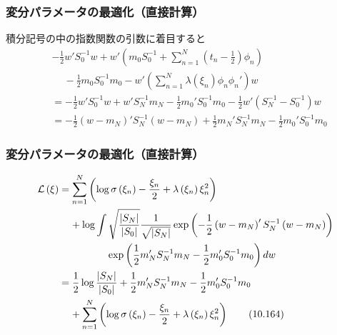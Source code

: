 \documentclass[10pt,hyperref={unicode}]{beamer}
\newcommand{\absolute}[1]{\left|#1\right|}
\newcommand{\parentheses}[1]{\left(#1\right)}
\newcommand{\energy}{\mathcal{L}}
\begin{document}
\begin{frame}
\frametitle{変分パラメータの最適化（直接計算）}
積分記号の中の指数関数の引数に着目すると
\begin{align*}
    &-\frac{1}{2}w'S_0^{-1}w
    + w'\parentheses{%
        m_0S_0^{-1} +
        \sum_{n = 1}^N \parentheses{t_n - \frac{1}{2}}\phi_n
    }\\
    &\phantom{-}- \frac{1}{2}m_0S_0^{-1}m_0
    - w'\parentheses{\sum_{n = 1}^N \lambda\parentheses{\xi_n}\phi_n\phi_n'}w
    \\
    &=-\frac{1}{2}w'S_0^{-1}w
    + w'S_N^{-1}m_N
    - \frac{1}{2}m_0'S_0^{-1}m_0
    - \frac{1}{2}w'\parentheses{S_N^{-1} - S_0^{-1}}w \\
    &= -\frac{1}{2}\parentheses{w - m_N}'S_N^{-1}\parentheses{w - m_N}
    + \frac{1}{2}m_N'S_N^{-1}m_N - \frac{1}{2}m_0'S_0^{-1}m_0
\end{align*}
\end{frame}

\begin{frame}
\frametitle{変分パラメータの最適化（直接計算）}
\begin{align}
    \energy\parentheses{\xi}
    &= \sum_{n = 1}^N
        \parentheses{%
            \log\sigma\parentheses{\xi_n}
            - \frac{\xi_n}{2}
            + \lambda\parentheses{\xi_n}\xi_n^2
        } \notag \\
    &\phantom{=}\ + \log \int \sqrt{\frac{\absolute{S_N}}{\absolute{S_0}}}\frac{1}{\sqrt{\absolute{S_N}}}\exp\parentheses{-\frac{1}{2}\parentheses{w - m_N}'S_N^{-1}\parentheses{w - m_N}} \notag \\
    &\phantom{=+\log\int}\ \exp\parentheses{\frac{1}{2}m_N'S_N^{-1}m_N - \frac{1}{2}m_0'S_0^{-1}m_0} dw \notag \\
    &= \frac{1}{2}\log\frac{\absolute{S_N}}{\absolute{S_0}}
        + \frac{1}{2}m_N'S_N^{-1}m_N - \frac{1}{2}m_0'S_0^{-1}m_0 \notag \\
    &\phantom{=}\ + \sum_{n = 1}^N
        \parentheses{%
            \log\sigma\parentheses{\xi_n}
            - \frac{\xi_n}{2}
            + \lambda\parentheses{\xi_n}\xi_n^2
        } \tag{10.164} \label{lxi}
\end{align}
\end{frame}
\end{document}

